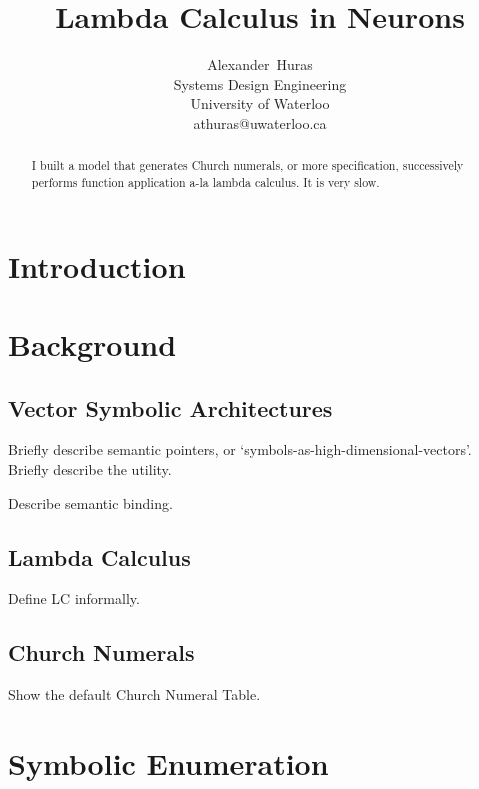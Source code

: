 \documentclass[journal]{IEEEtran}
\begin{document}
\title{Lambda Calculus in Neurons}

\author{Alexander~Huras\\Systems Design Engineering\\University of Waterloo\\athuras@uwaterloo.ca}%



\maketitle

\begin{abstract}
	I built a model that generates Church numerals, or more specification, successively performs function application a-la lambda calculus.
	It is very slow.

\end{abstract}


\section{Introduction}

\section{Background}

\subsection{Vector Symbolic Architectures}

Briefly describe semantic pointers, or `symbols-as-high-dimensional-vectors'.
Briefly describe the utility.

Describe semantic binding.

\subsection{Lambda Calculus}

Define LC informally.

\subsection{Church Numerals}

Show the default Church Numeral Table.

\section{Symbolic Enumeration}
\end{document}
